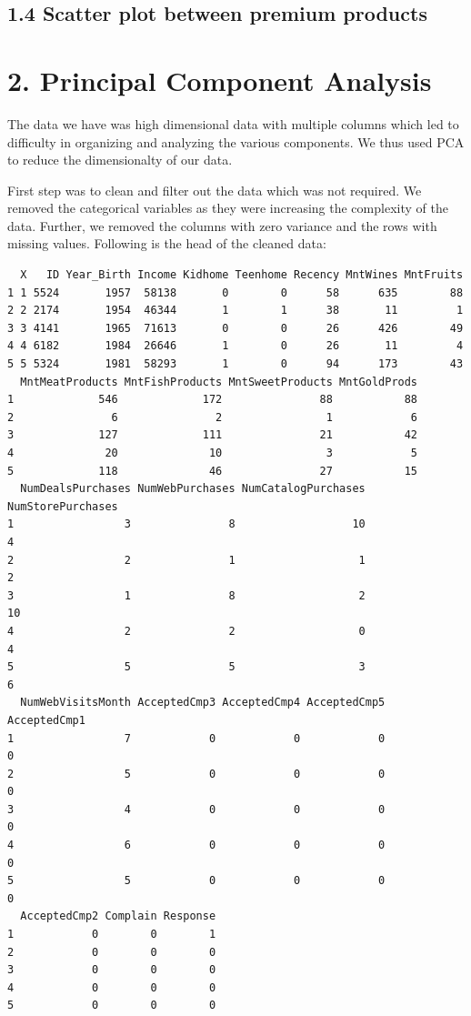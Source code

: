 \documentclass[
  a4paperpaper,
  DIV=11,
  numbers=noendperiod]{scrartcl}
\begin{document}
\hypertarget{scatter-plot-between-premium-products}{%
\subsection{1.4 Scatter plot between premium
products}\label{scatter-plot-between-premium-products}}

\hypertarget{principal-component-analysis}{%
\section{2. Principal Component
Analysis}\label{principal-component-analysis}}

The data we have was high dimensional data with multiple columns which
led to difficulty in organizing and analyzing the various components. We
thus used PCA to reduce the dimensionalty of our data.

First step was to clean and filter out the data which was not required.
We removed the categorical variables as they were increasing the
complexity of the data. Further, we removed the columns with zero
variance and the rows with missing values. Following is the head of the
cleaned data:

\begin{verbatim}
  X   ID Year_Birth Income Kidhome Teenhome Recency MntWines MntFruits
1 1 5524       1957  58138       0        0      58      635        88
2 2 2174       1954  46344       1        1      38       11         1
3 3 4141       1965  71613       0        0      26      426        49
4 4 6182       1984  26646       1        0      26       11         4
5 5 5324       1981  58293       1        0      94      173        43
  MntMeatProducts MntFishProducts MntSweetProducts MntGoldProds
1             546             172               88           88
2               6               2                1            6
3             127             111               21           42
4              20              10                3            5
5             118              46               27           15
  NumDealsPurchases NumWebPurchases NumCatalogPurchases NumStorePurchases
1                 3               8                  10                 4
2                 2               1                   1                 2
3                 1               8                   2                10
4                 2               2                   0                 4
5                 5               5                   3                 6
  NumWebVisitsMonth AcceptedCmp3 AcceptedCmp4 AcceptedCmp5 AcceptedCmp1
1                 7            0            0            0            0
2                 5            0            0            0            0
3                 4            0            0            0            0
4                 6            0            0            0            0
5                 5            0            0            0            0
  AcceptedCmp2 Complain Response
1            0        0        1
2            0        0        0
3            0        0        0
4            0        0        0
5            0        0        0
\end{verbatim}
\end{document}

